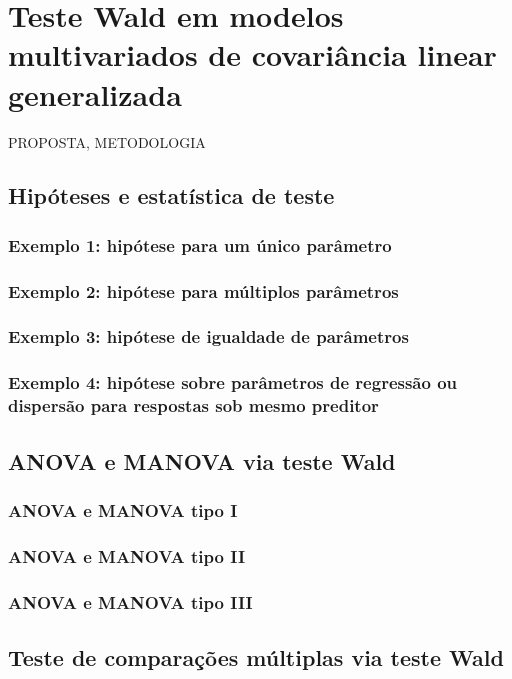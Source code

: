 
\chapter{Teste Wald em modelos multivariados de covariância linear generalizada}

PROPOSTA, METODOLOGIA


\section{Hipóteses e estatística de teste}
\subsection{Exemplo 1: hipótese para um único parâmetro}
\subsection{Exemplo 2: hipótese para múltiplos parâmetros}
\subsection{Exemplo 3: hipótese de igualdade de parâmetros}
\subsection{Exemplo 4: hipótese sobre parâmetros de regressão ou dispersão para respostas sob mesmo preditor}


\section{ANOVA e MANOVA via teste Wald}
\subsection{ANOVA e MANOVA tipo I}
\subsection{ANOVA e MANOVA tipo II}
\subsection{ANOVA e MANOVA tipo III}


\section{Teste de comparações múltiplas via teste Wald}

